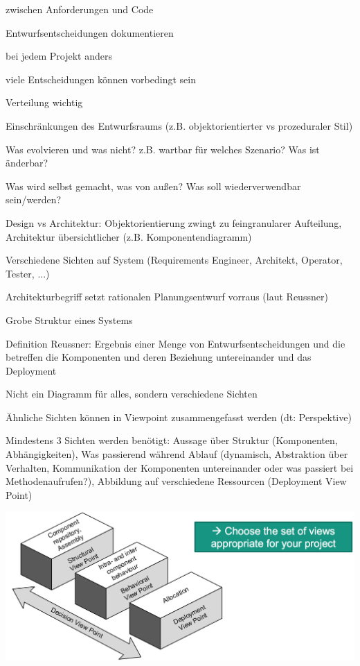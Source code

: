 \documentclass[paper=a4, fontsize=11pt]{scrartcl} %
\numberwithin{equation}{section} %
\numberwithin{figure}{section} %
\numberwithin{table}{section} %
\begin{document}
\begin{itemize}
  \item zwischen Anforderungen und Code
  \item Entwurfsentscheidungen dokumentieren
  \item bei jedem Projekt anders
  \item viele Entscheidungen können vorbedingt sein
  \item Verteilung wichtig
  \item Einschränkungen des Entwurfsraums (z.B. objektorientierter vs prozeduraler Stil)
  \item Was evolvieren und was nicht? z.B. wartbar für welches Szenario? Was ist änderbar?
  \item Was wird selbst gemacht, was von außen? Was soll wiederverwendbar sein/werden?
  \item Design vs Architektur: Objektorientierung zwingt zu feingranularer Aufteilung, Architektur übersichtlicher (z.B. Komponentendiagramm)
  \item Verschiedene Sichten auf System (Requirements Engineer, Architekt, Operator, Tester, ...)
  \item Architekturbegriff setzt rationalen Planungsentwurf vorraus (laut Reussner)
  \item Grobe Struktur eines Systems
  \item Definition Reussner: Ergebnis einer Menge von Entwurfsentscheidungen und die betreffen die Komponenten und deren Beziehung untereinander und das Deployment
  \item Nicht ein Diagramm für alles, sondern verschiedene Sichten
  \item Ähnliche Sichten können in Viewpoint zusammengefasst werden (dt: Perspektive)\\
  \begin{minipage}{.5\textwidth}
    \item Mindestens 3 Sichten werden benötigt: Aussage über Struktur (Komponenten, Abhängigkeiten), Was passierend während Ablauf (dynamisch, Abstraktion über Verhalten, Kommunikation der Komponenten untereinander oder was passiert bei Methodenaufrufen?), Abbildung auf verschiedene Ressourcen (Deployment View Point)
  \end{minipage}
  \begin{minipage}{.5\textwidth}
    \includegraphics[width=\linewidth]{imgs/viewpoints}

\end{minipage}
\end{itemize}
\end{document}
